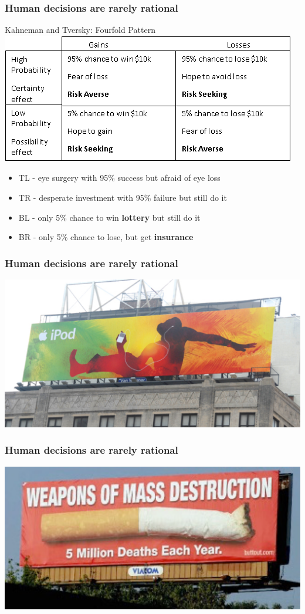 \documentclass{beamer}
\begin{document}
\begin{frame}
	\frametitle{Human decisions are rarely rational}
	Kahneman and Tversky: Fourfold Pattern \vfill
	\centering
	\includegraphics[width=0.8\linewidth]{image/fourfold}
	\begin{itemize}
		\item TL - eye surgery with 95\% success but afraid of eye loss
		\item TR - desperate investment with 95\% failure but still do it
		\item BL - only 5\% chance to win \textbf{lottery} but still do it
		\item BR - only 5\% chance to lose, but get \textbf{insurance}
	\end{itemize}
\end{frame}

\begin{frame}
	\frametitle{Human decisions are rarely rational}
	\centering
	\includegraphics[width=1\linewidth]{image/brain6}
\end{frame}

\begin{frame}
	\frametitle{Human decisions are rarely rational}
	\centering
	\includegraphics[width=1\linewidth]{image/brain7}
\end{frame}
\end{document}
